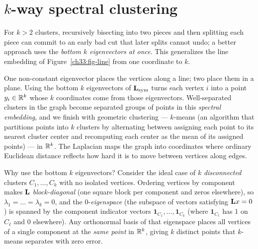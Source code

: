 \section{$k$-way spectral clustering}
\label{ch33:kway}

For $k>2$ clusters, recursively bisecting into two pieces and then splitting each piece can commit to an early bad cut that later splits cannot undo; a better approach uses the \emph{bottom $k$
eigenvectors at once}. This generalizes the line embedding of Figure~\ref{ch33:fig-line} from one
coordinate to $k$.

\begin{intuitionbox}
One non-constant eigenvector places the vertices along a line; two place them in a plane. Using the bottom $k$ eigenvectors of $\mathbf{L}_{\mathrm{sym}}$ turns each vertex $i$ into a point $y_i\in\mathbb{R}^{k}$ whose $k$ coordinates come from those eigenvectors. Well-separated clusters in the graph become separated groups of points in this
\emph{spectral embedding}, and we finish with geometric clustering --- $k$-means (an algorithm that partitions points into $k$ clusters by alternating between assigning each point to its nearest cluster center and recomputing each center as the mean of its assigned points) --- in $\mathbb{R}^k$.
The Laplacian maps the graph into coordinates where ordinary Euclidean distance reflects how hard it is to move between vertices along edges.
\end{intuitionbox}

Why use the bottom $k$ eigenvectors? Consider the ideal case of $k$ \emph{disconnected} clusters $C_1,\dots,C_k$ with no isolated vertices. Ordering vertices by component makes $\mathbf{L}$
\emph{block-diagonal} (one square block per component and zeros elsewhere), so $\lambda_1=\dots=\lambda_k=0$, and the $0$-\emph{eigenspace} (the subspace of vectors satisfying $\mathbf{L} x = 0$) is spanned by the component indicator vectors
$\mathbf{1}_{C_1},\dots,\mathbf{1}_{C_k}$ (where $\mathbf{1}_{C_\ell}$ has $1$ on $C_\ell$ and $0$ elsewhere). Any orthonormal basis of that eigenspace places all vertices of a single component at the \emph{same point} in $\mathbb{R}^k$, giving $k$ distinct points that $k$-means separates with zero error.

